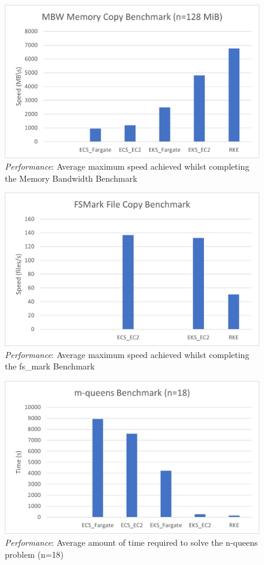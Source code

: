 \begin{figure}[hp]
  \includegraphics{images/perf-MBW.png}
  \caption{\emph{Performance}: Average maximum speed achieved whilst completing the Memory Bandwidth Benchmark }
  \label{fig:perf_MBW}
\end{figure}

\begin{figure}[hp]
  \includegraphics{images/perf-FSMark.png}
  \caption{\emph{Performance}: Average maximum speed achieved whilst completing the fs\_mark Benchmark }
  \label{fig:perf_FSMark}
\end{figure}

\begin{figure}[hp]
  \includegraphics{images/perf-m_queens.png}
  \caption{\emph{Performance}: Average amount of time required to solve the n-queens problem (n=18) }
  \label{fig:perf_mQueens}
\end{figure}


